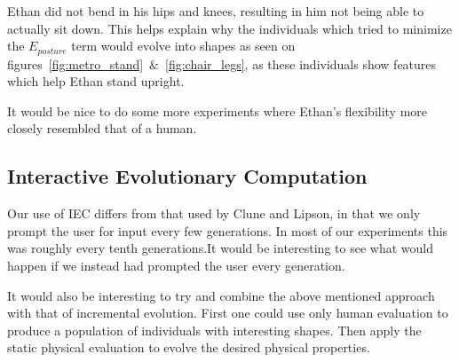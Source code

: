 Ethan did not bend in his hips and knees, resulting in him not being able to 
actually sit down. This helps explain why the individuals which tried to 
minimize the $E_{posture}$ term would evolve into shapes as seen on
figures~\ref{fig:metro_stand}~\&~\ref{fig:chair_legs}, as these individuals 
show features which help Ethan stand upright. 

It would be nice to do 
some more experiments where Ethan's flexibility more closely resembled that of 
a human.

\subsection{Interactive Evolutionary Computation}
Our use of IEC differs from that used by Clune and 
Lipson\cite{Clune:2011:EOG:2078245.2078246}, in that we only prompt the user 
for input every few generations. In most of our experiments this was roughly 
every tenth generations.It would be interesting to see what would happen if we 
instead had prompted the user every generation. 

It would also be interesting to try and combine the above mentioned approach 
with that of incremental evolution. First one could use only human evaluation 
to produce a population of individuals with interesting shapes. Then apply the 
static physical evaluation to evolve the desired physical properties.
